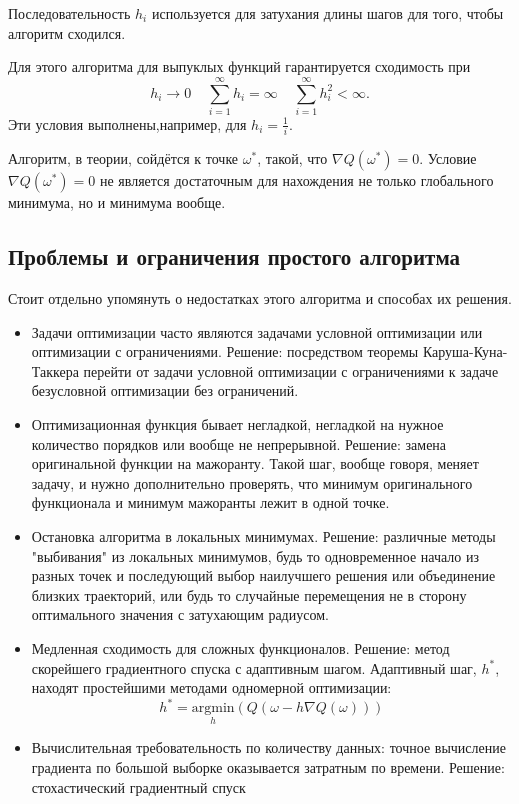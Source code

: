 \documentclass{article}
\begin{document}
Последовательность $h_i$ используется для затухания длины шагов для того, чтобы алгоритм сходился. 

Для этого алгоритма для выпуклых функций гарантируется сходимость при
$$
h_i \to 0\;\;\;\; \sum\limits_{i=1}^{\infty}h_i = \infty \;\;\;\; \sum\limits_{i=1}^{\infty}h_i^2 < \infty.
$$
Эти условия выполнены,например, для $h_i = \frac{1}{i}$.

Алгоритм, в теории, сойдётся к точке $\omega^{\ast}$, такой, что $\nabla Q(\omega^{\ast}) = 0$. Условие $\nabla Q(\omega^{\ast}) = 0$ не является достаточным для нахождения не только глобального минимума, но и минимума вообще.

\subsection{Проблемы и ограничения простого алгоритма}
Стоит отдельно упомянуть о недостатках этого алгоритма и способах их решения.
\begin{itemize}
    \item Задачи оптимизации часто являются задачами условной оптимизации или оптимизации с ограничениями. Решение: посредством теоремы Каруша-Куна-Таккера перейти от задачи условной оптимизации с ограничениями к задаче безусловной оптимизации без ограничений.
    \item Оптимизационная функция бывает негладкой, негладкой на нужное количество порядков или вообще не непрерывной. Решение: замена оригинальной функции на мажоранту. Такой шаг, вообще говоря, меняет задачу, и нужно дополнительно проверять, что минимум оригинального функционала и минимум мажоранты лежит в одной точке.
    \item Остановка алгоритма в локальных минимумах. Решение: различные методы "выбивания" из локальных минимумов, будь то одновременное начало из разных точек и последующий выбор наилучшего решения или объединение близких траекторий, или будь то случайные перемещения не в сторону оптимального значения с затухающим радиусом. 
    \item Медленная сходимость для сложных функционалов. Решение: метод скорейшего градиентного спуска с адаптивным шагом. Адаптивный шаг, $h^{\ast}$, находят простейшими методами одномерной оптимизации: 
    $$
    h^{\ast} = \underset{h}{\text{argmin}}{\left(Q(\omega - h \nabla Q(\omega))\right)}
    $$
    \item Вычислительная требовательность по количеству данных: точное вычисление градиента по большой выборке оказывается затратным по времени. Решение: стохастический градиентный спуск
\end{itemize}
\end{document}
